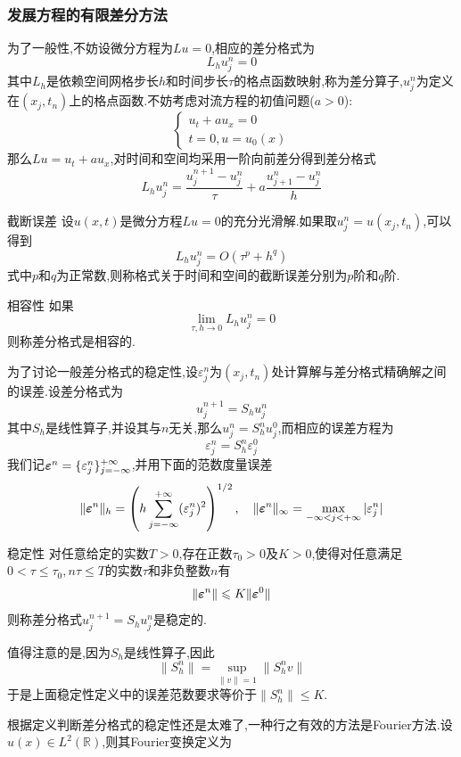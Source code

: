 \subsubsection{发展方程的有限差分方法}
为了一般性,不妨设微分方程为$Lu=0$,相应的差分格式为
$$
L_hu^n_j=0
$$
其中$L_h$是依赖空间网格步长$h$和时间步长$\tau$的格点函数映射,称为差分算子,$u^n_j$为定义在$(x_j,t_n)$上的格点函数.不妨考虑对流方程的初值问题($a>0$):
\begin{equation}
    \begin{cases}
        u_t+au_x=0\\
        t=0,u=u_0(x)
    \end{cases}
    \label{eq:3.2}
\end{equation}
那么$Lu=u_t+au_x$,对时间和空间均采用一阶向前差分得到差分格式
$$
L_hu^n_j=\frac{u^{n+1}_j-u^n_j}{\tau}+a\frac{u^n_{j+1}-u^n_j}{h}
$$
\begin{Definition}{截断误差}
    设$u(x,t)$是微分方程$Lu=0$的充分光滑解.如果取$u^n_j=u(x_j,t_n)$,可以得到
    $$
    L_hu^n_j=O(\tau^p+h^q)
    $$
    式中$p$和$q$为正常数,则称格式关于时间和空间的截断误差分别为$p$阶和$q$阶.
\end{Definition}
\begin{Definition}{相容性}
    如果
    $$
    \lim_{\tau,h\to 0}L_hu^n_j=0
    $$
    则称差分格式是相容的.
\end{Definition}
为了讨论一般差分格式的稳定性,设$\varepsilon^n_j$为$(x_j,t_n)$处计算解与差分格式精确解之间的误差.设差分格式为
$$
u^{n+1}_j=S_hu^n_j
$$
其中$S_h$是线性算子,并设其与$n$无关,那么$u^n_j=S^n_hu^0_j$,而相应的误差方程为
$$
\varepsilon^n_j=S^n_h\varepsilon^0_j
$$
\qquad 我们记$\bm{\varepsilon}^n=\{\varepsilon^n_j\}_{j=-\infty}^{+\infty}$,并用下面的范数度量误差
$$
\|\bm{\varepsilon}^n\|_h=\left(h\sum_{j=-\infty}^{+\infty}(\varepsilon^n_j)^2\right)^{1/2},\quad \|\bm{\varepsilon}^n\|_{\infty}=\max_{-\infty<j<+\infty}|\varepsilon^n_j|
$$
\begin{Definition}{稳定性}
    对任意给定的实数$T>0$,存在正数$\tau_0>0$及$K>0$,使得对任意满足$0<\tau\leqslant\tau_0,n\tau\leqslant T$的实数$\tau$和非负整数$n$有
    $$
    \|\bm{\varepsilon}^n\|\leqslant K \|\bm{\varepsilon}^0\|
    $$
    则称差分格式$u^{n+1}_j=S_hu^n_j$是稳定的.
\end{Definition}
值得注意的是,因为$S_h$是线性算子,因此
$$
\|S^n_h\|=\sup_{\|v\|=1}\|S^n_hv\|
$$
于是上面稳定性定义中的误差范数要求等价于$\|S^n_h\|\leqslant K$.\par
根据定义判断差分格式的稳定性还是太难了,一种行之有效的方法是Fourier方法.设$u(x)\in L^2(\mathbb{R})$,则其Fourier变换定义为
